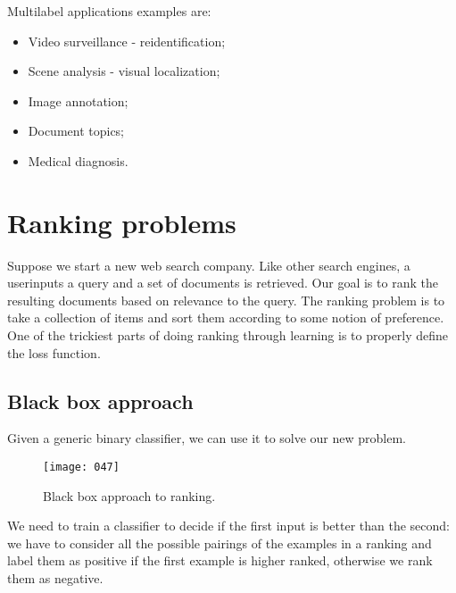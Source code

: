 Multilabel applications examples are:
\begin{itemize}[topsep={0pt}, partopsep={0pt}]
    \item Video surveillance - reidentification;
    \item Scene analysis - visual localization;
    \item Image annotation;
    \item Document topics;
    \item Medical diagnosis.
\end{itemize}

\section{Ranking problems}
Suppose we start a new web search company. Like other search engines, a userinputs a query and a set of documents is retrieved. Our goal is to rank the resulting documents based on relevance to the query. The ranking problem is to take a collection of items and sort them according to some notion of preference. One of the trickiest parts of doing ranking through learning is to properly define the loss function.

\subsection{Black box approach}
Given a generic binary classifier, we can use it to solve our new problem.
\begin{figure}[h!]
    \centering
    \texttt{[image: 047]}
    \caption{Black box approach to ranking.}
\end{figure}
We need to train a classifier to decide if the first input is better than the second: we have to consider all the possible pairings of the examples in a ranking and label them as positive if the first example is higher ranked, otherwise we rank them as negative.

